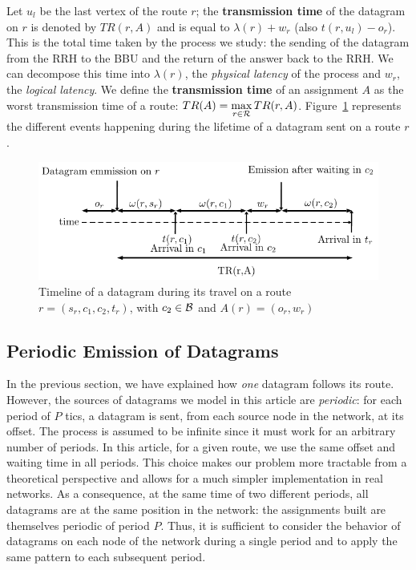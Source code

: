 \documentclass[a4paper,10pt]{journal}
\begin{document}
 		 Let $u_l$ be the last vertex of the route $r$; the \textbf{transmission time} of the datagram on 
  		$r$ is denoted by $TR(r,A)$ and is equal to $\lambda(r) + w_r$ (also $t(r,u_l) - o_r$). This is the total time taken by the process we study: the sending of the datagram from the RRH to the BBU and the return of the answer back to the RRH. We can decompose this time into $\lambda(r)$, the \emph{physical latency} of the process and $w_r$, the \emph{logical latency}. 
  		We define the \textbf{transmission time} of an assignment $A$ as the worst transmission time of a route: $TR(A) = \displaystyle \max\limits_{r \in {\cal R}} TR(r,A)$. 
        Figure~\ref{fig:datagramtimeline} represents the different events happening during the lifetime of a datagram sent on a route $r$.
  		\begin{figure}
  		 \begin{center}
      \includegraphics[width=\textwidth]{time.pdf}
      \end{center}
      \caption{Timeline of a datagram during its travel on a route $r = (s_r,c_1,c_2,t_r)$, with $c_2 \in \cal{B}$ and $A(r) = (o_r,w_r)$}
      \label{fig:datagramtimeline}
  		\end{figure}




 	\subsection{Periodic Emission of Datagrams}

	
	In the previous section, we have explained how \emph{one} datagram follows its route.
	However, the sources of datagrams we model in this article are \emph{periodic}: for each period of $P$ tics, a datagram is sent, from each source node in the network, at its offset. The process is assumed to be infinite since it must work for an arbitrary number of periods. In this article, for a given route, we use the same offset and waiting time in all periods. This choice makes our problem more tractable from a theoretical perspective and allows for a much simpler implementation in real networks. As a consequence, at the same time of two different periods, all datagrams are at the same position in the network: the assignments built are themselves periodic of period $P$. Thus, it is sufficient to consider the behavior of datagrams on each node of the network during a single period and to apply the same pattern to each subsequent period. 
\end{document}
